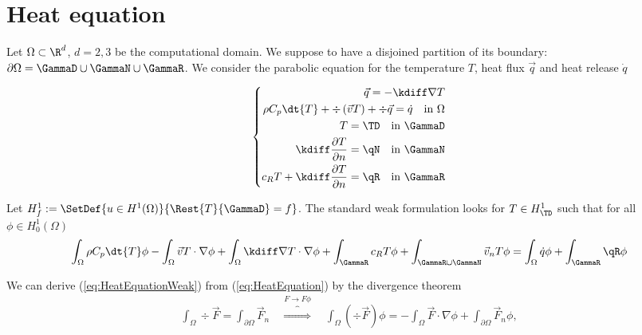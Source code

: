 %
\section{Heat equation}\label{sec:Heat}
%
Let $\Omega\subset \R^d$, $d=2,3$ be the computational domain. We suppose to have a disjoined partition of its boundary:
$\partial\Omega=\GammaD\cup\GammaN\cup\GammaR$.
%
We consider the parabolic equation for the temperature $T$, heat flux $\vec{q}$ and heat release $\dot{q}$
%
\begin{yellowbox}
\begin{equation}\label{eq:HeatEquation}
%
\left\{
\begin{aligned}
\vec{q} = - \kdiff \nabla T\\
\rho C_p \dt{T} + \div\left(\vec{v} T\right)+\div\vec{q} = \dot{q} \quad \mbox{in $\Omega$}\\
T = \TD \quad \mbox{in $\GammaD$}\\
\kdiff\frac{\partial T}{\partial n} = \qN \quad \mbox{in $\GammaN$}\\
c_R T + \kdiff\frac{\partial T}{\partial n}= \qR \quad \mbox{in $\GammaR$}
\end{aligned}
\right.
%
\end{equation}
\end{yellowbox}
%
\begin{yellowbox}
Let $H^1_{f}:= \SetDef{u\in H^1(\Omega)}{\Rest{T}{\GammaD} = f}$. The standard weak formulation looks for 
$T\in H^1_{\TD}$ such that for all $\phi\in H^1_{0}(\Omega)$
%
\begin{equation}\label{eq:HeatEquationWeak}
\int_{\Omega}\rho C_p \dt{T}\phi - \int_{\Omega}\vec{v} T\cdot \nabla \phi
+  \int_{\Omega} \kdiff\nabla T \cdot\nabla \phi + \int_{\GammaR} c_R T \phi 
+ \int_{\GammaR\cup\GammaN} \vec{v}_n T \phi
= \int_{\Omega} \dot{q} \phi +  \int_{\GammaR} \qR \phi
\end{equation}
\end{yellowbox}
%
We can derive (\ref{eq:HeatEquationWeak}) from (\ref{eq:HeatEquation}) by the divergence theorem
%
\begin{align*}
\int_{\Omega} \div\vec{F} = \int_{\partial\Omega} \vec{F}_n\quad\overbrace{\Longrightarrow}^{F\to F\phi}\quad 
\int_{\Omega} (\div\vec{F}) \phi = -\int_{\Omega} \vec{F}\cdot \nabla\phi + \int_{\partial\Omega} \vec{F}_n\phi,
\end{align*}
